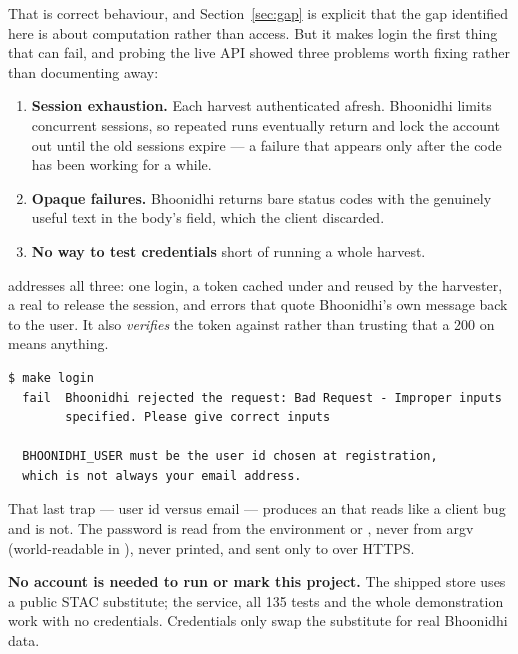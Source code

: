 That is correct behaviour, and Section~\ref{sec:gap} is explicit that the gap
identified here is about computation rather than access. But it makes login
the first thing that can fail, and probing the live API showed three problems
worth fixing rather than documenting away:

\begin{enumerate}[leftmargin=1.8em,itemsep=0.4ex]
  \item \textbf{Session exhaustion.} Each harvest authenticated afresh.
        Bhoonidhi limits concurrent sessions, so repeated runs eventually
        return  and lock the account out until the old sessions
        expire --- a failure that appears only after the code has been working
        for a while.
  \item \textbf{Opaque failures.} Bhoonidhi returns bare status codes with the
        genuinely useful text in the body's  field, which the
        client discarded.
  \item \textbf{No way to test credentials} short of running a whole harvest.
\end{enumerate}

 addresses all three: one login, a token
cached  under  and reused by the harvester, a real
 to release the session, and errors that quote Bhoonidhi's
own message back to the user. It also \emph{verifies} the token against
 rather than trusting that a 200 on 
means anything.

\begin{lstlisting}
$ make login
  fail  Bhoonidhi rejected the request: Bad Request - Improper inputs
        specified. Please give correct inputs

  BHOONIDHI_USER must be the user id chosen at registration,
  which is not always your email address.
\end{lstlisting}

That last trap --- user id versus email --- produces an 
that reads like a client bug and is not. The password is read from the
environment or , never from argv (world-readable in ),
never printed, and sent only to  over HTTPS.

\textbf{No account is needed to run or mark this project.} The shipped store
uses a public STAC substitute; the service, all 135 tests and the whole
demonstration work with no credentials. Credentials only swap the substitute
for real Bhoonidhi data.

